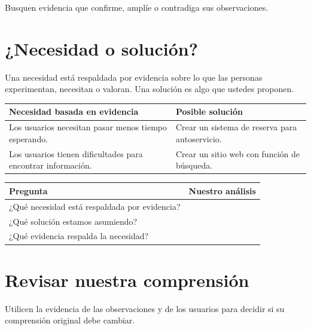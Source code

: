 \documentclass[12pt]{article}
\begin{document}
	Busquen evidencia que confirme, amplíe o contradiga sus observaciones.
	
	\section{¿Necesidad o solución?}
	
	Una necesidad está respaldada por evidencia sobre lo que las personas experimentan, necesitan o valoran. Una solución es algo que ustedes proponen.
	
	\begin{center}
		\small
		\begin{tabular}{|L{0.40\textwidth}|L{0.43\textwidth}|}
			\hline
			\textbf{Necesidad basada en evidencia} & \textbf{Posible solución} \\
			\hline
			Los usuarios necesitan pasar menos tiempo esperando. & Crear un sistema de reserva para autoservicio. \\
			\hline
			Los usuarios tienen dificultades para encontrar información. & Crear un sitio web con función de búsqueda. \\
			\hline
		\end{tabular}
	\end{center}
	
	\begin{center}
		\small
		\begin{tabular}{|L{0.30\textwidth}|L{0.53\textwidth}|}
			\hline
			\textbf{Pregunta} & \textbf{Nuestro análisis} \\
			\hline
			¿Qué necesidad está respaldada por evidencia? & \rule{0pt}{1.0cm} \\
			\hline
			¿Qué solución estamos asumiendo? & \rule{0pt}{1.0cm} \\
			\hline
			¿Qué evidencia respalda la necesidad? & \rule{0pt}{1.0cm} \\
			\hline
		\end{tabular}
	\end{center}
	
	\vspace{-0.39cm}
	
	\section{Revisar nuestra comprensión}
	
	\vspace{-0.09cm}
	Utilicen la evidencia de las observaciones y de los usuarios para decidir si su comprensión original debe cambiar.
	
\end{document}

